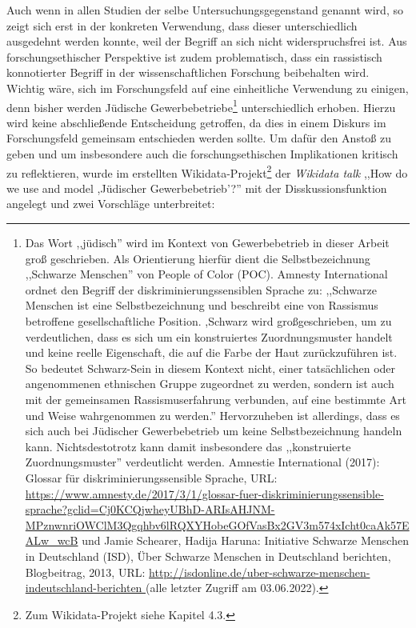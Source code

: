 Auch wenn in allen Studien der selbe Untersuchungsgegenstand genannt wird, so zeigt sich erst in der konkreten Verwendung, dass dieser unterschiedlich ausgedehnt werden konnte, weil der Begriff an sich nicht widerspruchsfrei ist. Aus forschungsethischer Perspektive ist zudem problematisch, dass ein rassistisch konnotierter Begriff in der wissenschaftlichen Forschung beibehalten wird. Wichtig wäre, sich im Forschungsfeld auf eine einheitliche Verwendung zu einigen, denn bisher werden Jüdische Gewerbebetriebe\footnote{Das Wort ,,jüdisch'' wird im Kontext von Gewerbebetrieb in dieser Arbeit groß geschrieben. Als Orientierung hierfür dient die Selbstbezeichnung ,,Schwarze Menschen'' von People of Color (POC). Amnesty International ordnet den Begriff der diskriminierungssensiblen Sprache zu: ,,Schwarze Menschen ist eine Selbstbezeichnung und beschreibt eine von Rassismus betroffene gesellschaftliche Position. ,Schwarz wird großgeschrieben, um zu verdeutlichen, dass es sich um ein konstruiertes Zuordnungsmuster handelt und keine reelle Eigenschaft, die auf die Farbe der Haut zurückzuführen ist. So bedeutet Schwarz-Sein in diesem Kontext nicht, einer tatsächlichen oder angenommenen ethnischen Gruppe zugeordnet zu werden, sondern ist auch mit der gemeinsamen Rassismuserfahrung verbunden, auf eine bestimmte Art und Weise wahrgenommen zu werden.'' Hervorzuheben ist allerdings, dass es sich auch bei Jüdischer Gewerbebetrieb um keine Selbstbezeichnung handeln kann. Nichtsdestotrotz kann damit insbesondere das ,,konstruierte Zuordnungsmuster'' verdeutlicht werden. Amnestie International (2017): Glossar für diskriminierungssensible Sprache, URL: \url{https://www.amnesty.de/2017/3/1/glossar-fuer-diskriminierungssensible-sprache?gclid=Cj0KCQjwheyUBhD-ARIsAHJNM-MPznwnriOWClM3Qgqhbv6lRQXYHobeGOfVasBx2GV3m574xIcht0caAk57EALw_wcB} und Jamie Schearer, Hadija Haruna: Initiative Schwarze Menschen in Deutschland (ISD), Über Schwarze Menschen in Deutschland berichten, Blogbeitrag, 2013, URL: \url{http://isdonline.de/uber-schwarze-menschen-indeutschland-berichten } (alle letzter Zugriff am 03.06.2022).} unterschiedlich erhoben. Hierzu wird keine abschließende Entscheidung getroffen, da dies in einem Diskurs im Forschungsfeld gemeinsam entschieden werden sollte. Um dafür den Anstoß zu geben und um insbesondere auch die forschungsethischen Implikationen kritisch zu reflektieren, wurde im erstellten Wikidata-Projekt\footnote{Zum Wikidata-Projekt siehe Kapitel 4.3.} der \textit{Wikidata talk} ,,How do we use and model ,Jüdischer Gewerbebetrieb'?'' mit der Disskussionsfunktion angelegt und zwei Vorschläge unterbreitet: 

